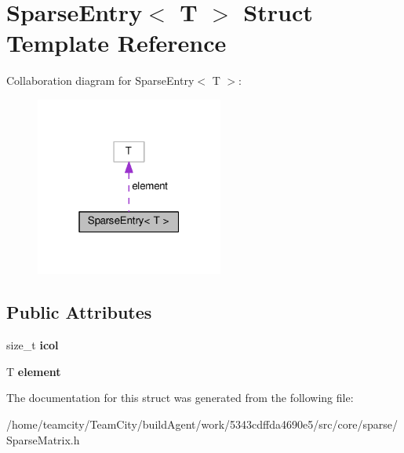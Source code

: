 \hypertarget{structSparseEntry}{}\section{Sparse\+Entry$<$ T $>$ Struct Template Reference}
\label{structSparseEntry}


Collaboration diagram for Sparse\+Entry$<$ T $>$\+:\nopagebreak
\begin{figure}[H]
\begin{center}
\leavevmode
\includegraphics[width=175pt]{structSparseEntry__coll__graph}
\end{center}
\end{figure}
\subsection*{Public Attributes}
\begin{DoxyCompactItemize}
\item 
size\+\_\+t {\bfseries icol}\hypertarget{structSparseEntry_a4d2f28eb765872b70a420f16394eb2f4}{}\label{structSparseEntry_a4d2f28eb765872b70a420f16394eb2f4}

\item 
T {\bfseries element}\hypertarget{structSparseEntry_a9dec94fc6dfd9a4f0d5f46b85fb885ba}{}\label{structSparseEntry_a9dec94fc6dfd9a4f0d5f46b85fb885ba}

\end{DoxyCompactItemize}


The documentation for this struct was generated from the following file\+:\begin{DoxyCompactItemize}
\item 
/home/teamcity/\+Team\+City/build\+Agent/work/5343cdffda4690e5/src/core/sparse/Sparse\+Matrix.\+h\end{DoxyCompactItemize}
